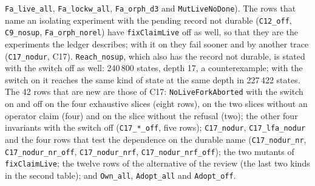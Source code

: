 \documentclass[a4paper,10pt,fleqn]{article}
\newcommand{\field}[1]{\texttt{#1}}
\begin{document}
\texttt{Fa\_live\_all}, \texttt{Fa\_lockw\_all}, \texttt{Fa\_orph\_d3} and
\texttt{MutLiveNoDone}). The rows that name an isolating experiment with the
pending record not durable (\texttt{C12\_off}, \texttt{C9\_nosup},
\texttt{Fa\_orph\_norel}) have \field{fixClaimLive} off as well, so that they
are the experiments the ledger describes; with it on they fail sooner and by
another trace (\texttt{C17\_nodur}, C17). \texttt{Reach\_nosup}, which also
has the record not durable, is stated with the switch off as well: 240\,800
states, depth 17, a counterexample; with the switch on it reaches the same
kind of state at the same depth in 227\,422 states. The 42 rows that are new are those
of C17: \field{NoLiveForkAborted} with the switch on and off on the four
exhaustive slices (eight rows), on the two slices without an operator
claim (four) and on the slice without the refusal (two); the other four invariants with the switch off
(\texttt{C17\_*\_off}, five rows); \texttt{C17\_nodur},
\texttt{C17\_lfa\_nodur} and the four rows that test the dependence on the
durable name (\texttt{C17\_nodur\_nr},
\texttt{C17\_nodur\_nr\_off}, \texttt{C17\_nodur\_nrf},
\texttt{C17\_nodur\_nrf\_off}); the two mutants of
\field{fixClaimLive}; the twelve rows of the alternative of the review (the last
two kinds in the second table); and \texttt{Own\_all}, \texttt{Adopt\_all} and
\texttt{Adopt\_off}.
\end{document}
